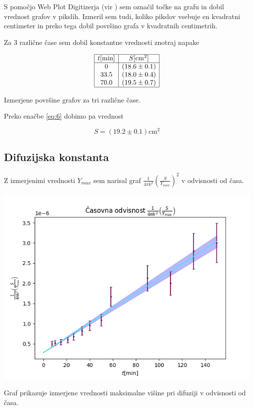 \documentclass[11pt]{article}
\begin{document}
S pomočjo Web Plot Digitizerja (vir \cite{noauthor_webplotdigitizer_nodate}) sem označil točke na grafu in dobil vrednost grafov v pikslih. Izmeril sem tudi, koliko pikslov vsebuje en kvadratni centimeter in preko tega dobil površino grafa v kvadratnih centimetrih.

Za 3 različne čase sem dobil konstantne vrednosti znotraj napake

\begin{tabela}
  \centering
\[
  \begin{array}{|c|c|} \hline
    t [\mathrm{min}] & S [\mathrm{cm} ^2] \\ \hline
   0 & (18.6 \pm 0.1) \\
    33.5 & (18.0 \pm 0.4) \\
    70.0 & (19.5 \pm 0.7) \\ \hline
  \end{array}
\]
\caption{\small Izmerjene površine grafov za tri različne čase.}
\end{tabela}

Preko enačbe \ref{eq:6} dobimo pa vrednost

\[ S = (19.2 \pm 0.1) \mathrm{cm} ^2
\]
\subsection{Difuzijska konstanta}\label{sec:orga79e3ef}

Z izmerjenimi vrednosti \(Y_{max}\) sem narisal graf \(\frac{1}{4 \pi k ^2} \left( \frac{S}{Y_{max}} \right)^2\) v odvisnosti od časa.

\begin{slika}[H]
  \centering
  \includegraphics{./figures/DifKonstanta.png}
  \caption{\small Graf prikazuje izmerjene vrednosti maksimalne višine pri difuziji v odvisnosti od časa.}
\end{slika}
\end{document}
